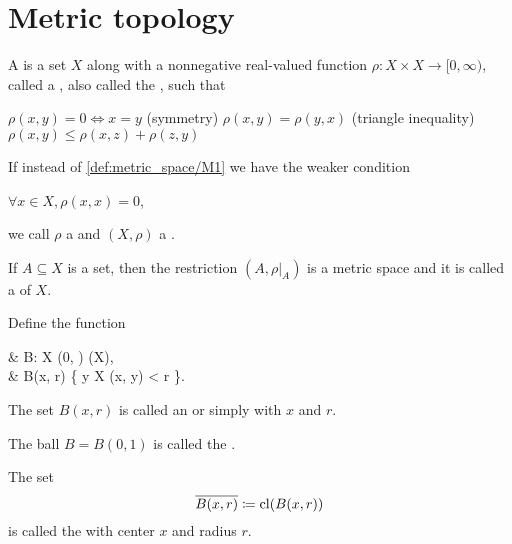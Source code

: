 \section{Metric topology}\label{sec:metric_topology}

\begin{definition}\label{def:metric_space}
  A  is a set \( X \) along with a nonnegative real-valued function \( \rho: X \times X \to [0, \infty) \), called a , also called the , such that
  \begin{thmenum}[series=def:metric_space]
     \( \rho(x, y) = 0 \iff x = y \)
    (symmetry) \( \rho(x, y) = \rho(y, x) \)
    (triangle inequality) \( \rho(x, y) \leq \rho(x, z) + \rho(z, y) \)
  \end{thmenum}

  If instead of \ref{def:metric_space/M1} we have the weaker condition
  \begin{thmenum}[resume=def:metric_space]
     \( \forall x \in X, \rho(x, x) = 0 \),
  \end{thmenum}
  we call \( \rho \) a  and \( (X, \rho) \) a .

  \begin{thmenum}
     If \( A \subseteq X \) is a set, then the restriction \( (A, \rho{\rvert_A}) \) is a metric space and it is called a  of \( X \).

     Define the function
    \begin{balign*}
       & B: X \times (0, \infty) \to \pow(X),                   \\
       & B(x, r) \coloneqq \{ y \in X \colon \rho(x, y) < r \}.
    \end{balign*}

    The set \( B(x, r) \) is called an  or simply  with  \( x \) and  \( r \).

    The ball \( B = B(0, 1) \) is called the .

     The set
    \begin{equation*}
      \oline{B(x, r)} \coloneqq \cl(B(x, r))
    \end{equation*}
    is called the  with center \( x \) and radius \( r \).


\end{thmenum}
\end{definition}
